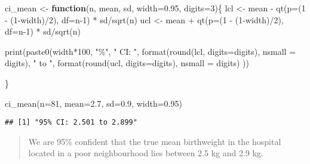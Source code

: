 \documentclass[
]{memoir}
\newenvironment{Shaded}{\begin{snugshade}}{\end{snugshade}}
\newcommand{\AttributeTok}[1]{\textcolor[rgb]{0.77,0.63,0.00}{#1}}
\newcommand{\ControlFlowTok}[1]{\textcolor[rgb]{0.13,0.29,0.53}{\textbf{#1}}}
\newcommand{\DecValTok}[1]{\textcolor[rgb]{0.00,0.00,0.81}{#1}}
\newcommand{\FloatTok}[1]{\textcolor[rgb]{0.00,0.00,0.81}{#1}}
\newcommand{\FunctionTok}[1]{\textcolor[rgb]{0.00,0.00,0.00}{#1}}
\newcommand{\NormalTok}[1]{#1}
\newcommand{\OtherTok}[1]{\textcolor[rgb]{0.56,0.35,0.01}{#1}}
\newcommand{\SpecialCharTok}[1]{\textcolor[rgb]{0.00,0.00,0.00}{#1}}
\newcommand{\StringTok}[1]{\textcolor[rgb]{0.31,0.60,0.02}{#1}}
\begin{document}
\begin{Shaded}
\begin{Highlighting}[]
\NormalTok{ci\_mean }\OtherTok{\textless{}{-}} \ControlFlowTok{function}\NormalTok{(n, mean, sd, }\AttributeTok{width=}\FloatTok{0.95}\NormalTok{, }\AttributeTok{digits=}\DecValTok{3}\NormalTok{)\{}
\NormalTok{  lcl }\OtherTok{\textless{}{-}}\NormalTok{ mean }\SpecialCharTok{{-}} \FunctionTok{qt}\NormalTok{(}\AttributeTok{p=}\NormalTok{(}\DecValTok{1} \SpecialCharTok{{-}}\NormalTok{ (}\DecValTok{1}\SpecialCharTok{{-}}\NormalTok{width)}\SpecialCharTok{/}\DecValTok{2}\NormalTok{), }\AttributeTok{df=}\NormalTok{n}\DecValTok{{-}1}\NormalTok{) }\SpecialCharTok{*}\NormalTok{ sd}\SpecialCharTok{/}\FunctionTok{sqrt}\NormalTok{(n)}
\NormalTok{  ucl }\OtherTok{\textless{}{-}}\NormalTok{ mean }\SpecialCharTok{+} \FunctionTok{qt}\NormalTok{(}\AttributeTok{p=}\NormalTok{(}\DecValTok{1} \SpecialCharTok{{-}}\NormalTok{ (}\DecValTok{1}\SpecialCharTok{{-}}\NormalTok{width)}\SpecialCharTok{/}\DecValTok{2}\NormalTok{), }\AttributeTok{df=}\NormalTok{n}\DecValTok{{-}1}\NormalTok{) }\SpecialCharTok{*}\NormalTok{ sd}\SpecialCharTok{/}\FunctionTok{sqrt}\NormalTok{(n)}
  
  \FunctionTok{print}\NormalTok{(}\FunctionTok{paste0}\NormalTok{(width}\SpecialCharTok{*}\DecValTok{100}\NormalTok{, }\StringTok{"\%"}\NormalTok{, }\StringTok{" CI: "}\NormalTok{, }
               \FunctionTok{format}\NormalTok{(}\FunctionTok{round}\NormalTok{(lcl, }\AttributeTok{digits=}\NormalTok{digits), }\AttributeTok{nsmall =}\NormalTok{ digits),}
               \StringTok{" to "}\NormalTok{, }\FunctionTok{format}\NormalTok{(}\FunctionTok{round}\NormalTok{(ucl, }\AttributeTok{digits=}\NormalTok{digits), }\AttributeTok{nsmall =}\NormalTok{ digits) ))}

\NormalTok{\}}

\FunctionTok{ci\_mean}\NormalTok{(}\AttributeTok{n=}\DecValTok{81}\NormalTok{, }\AttributeTok{mean=}\FloatTok{2.7}\NormalTok{, }\AttributeTok{sd=}\FloatTok{0.9}\NormalTok{, }\AttributeTok{width=}\FloatTok{0.95}\NormalTok{)}
\end{Highlighting}
\end{Shaded}

\begin{verbatim}
## [1] "95% CI: 2.501 to 2.899"
\end{verbatim}

\begin{quote}
We are 95\% confident that the true mean birthweight in the hospital located in a poor neighbourhood lies between 2.5 kg and 2.9 kg.
\end{quote}
\end{document}
